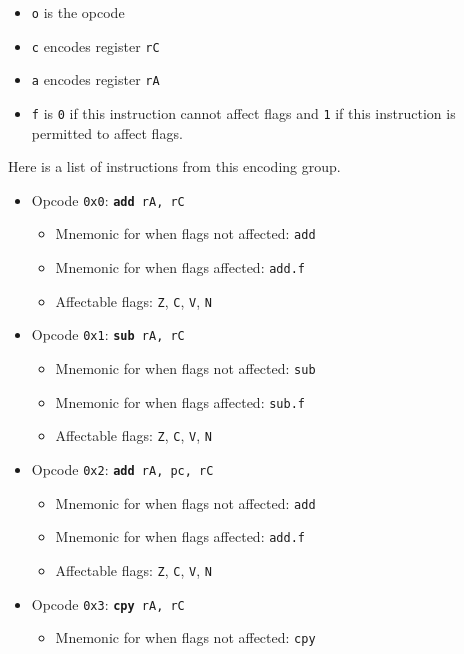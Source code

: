 \documentclass{article}
\begin{document}
	\singlespacing
	\begin{itemize}
		\item \texttt{o} is the opcode
		\item \texttt{c} encodes register \texttt{rC}
		\item \texttt{a} encodes register \texttt{rA}
		\item \texttt{f} is \texttt{0} if this instruction cannot affect
		flags and \texttt{1} if this instruction is permitted to affect
		flags. 
	\end{itemize}
	\doublespacing

	Here is a list of instructions from this encoding group.

	\singlespacing
	\begin{itemize}
		\item Opcode \texttt{0x0}:
			\texttt{\textbf{add} rA, rC}
		\begin{itemize}
			\item Mnemonic for when flags not affected:  \texttt{add}
			\item Mnemonic for when flags affected:  \texttt{add.f}
			\item Affectable flags:
				\texttt{Z}, \texttt{C}, \texttt{V}, \texttt{N}
		\end{itemize}
		\item Opcode \texttt{0x1}:
			\texttt{\textbf{sub} rA, rC}
		\begin{itemize}
			\item Mnemonic for when flags not affected:  \texttt{sub}
			\item Mnemonic for when flags affected:  \texttt{sub.f}
			\item Affectable flags:
				\texttt{Z}, \texttt{C}, \texttt{V}, \texttt{N}
		\end{itemize}
		\item Opcode \texttt{0x2}:
			\texttt{\textbf{add} rA, pc, rC}
		\begin{itemize}
			\item Mnemonic for when flags not affected:  \texttt{add}
			\item Mnemonic for when flags affected:  \texttt{add.f}
			\item Affectable flags:
				\texttt{Z}, \texttt{C}, \texttt{V}, \texttt{N}
		\end{itemize}
		\item Opcode \texttt{0x3}:
			\texttt{\textbf{cpy} rA, rC}
		\begin{itemize}
			\item Mnemonic for when flags not affected:  \texttt{cpy}

\end{itemize}
\end{itemize}
\end{document}
